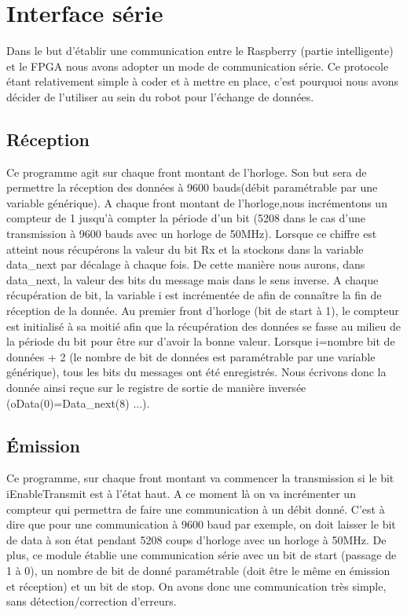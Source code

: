 \section{Interface série}
Dans le but d'établir une communication entre le Raspberry (partie intelligente) et le FPGA nous avons adopter un mode de communication série. Ce protocole étant relativement simple à 
coder et à mettre en place, c'est pourquoi nous avons décider de l'utiliser au sein du robot pour l'échange de données.

\subsection{Réception}
Ce programme agit sur chaque front montant de l'horloge. Son but sera de permettre la réception des
données à 9600 bauds(débit paramétrable par une variable générique).
A chaque front montant de l'horloge,nous incrémentons un compteur
de 1 jusqu'à compter la période d'un bit (5208 dans le cas d'une transmission à 9600 bauds avec un horloge de 50MHz). Lorsque ce chiffre est atteint nous récupérons la
valeur du bit Rx et la stockons dans la variable data\_next par décalage à chaque fois. De cette
manière nous aurons, dans data\_next, la valeur des bits du message mais dans le sens inverse. A
chaque récupération de bit, la variable i est incrémentée de afin de connaître la fin de réception de
la donnée.
Au premier front d'horloge (bit de start à 1), le compteur est initialisé à sa moitié afin que la
récupération des données se fasse au milieu de la période du bit pour être sur d'avoir la bonne
valeur.
Lorsque i=nombre bit de données + 2 (le nombre de bit de données est paramétrable par une variable générique), tous les bits du messages ont été enregistrés.
Nous écrivons donc la donnée ainsi reçue sur le registre de sortie de manière inversée (oData(0)=Data\_next(8) ...).

\subsection{Émission}
Ce programme, sur chaque front montant va commencer la transmission si le bit iEnableTransmit est à l'état haut. A ce moment là on va incrémenter un compteur qui
permettra de faire une communication à un débit donné. C'est à dire que pour une communication à 9600 baud par exemple, on doit laisser le bit de data à son état 
pendant 5208 coups d'horloge avec un horloge à 50MHz. De plus, ce module établie une communication série avec un bit de start (passage de 1 à 0), un nombre de bit de donné
paramétrable (doit être le même en émission et réception) et un bit de stop.
On avons donc une communication très simple, sans détection/correction d'erreurs.

